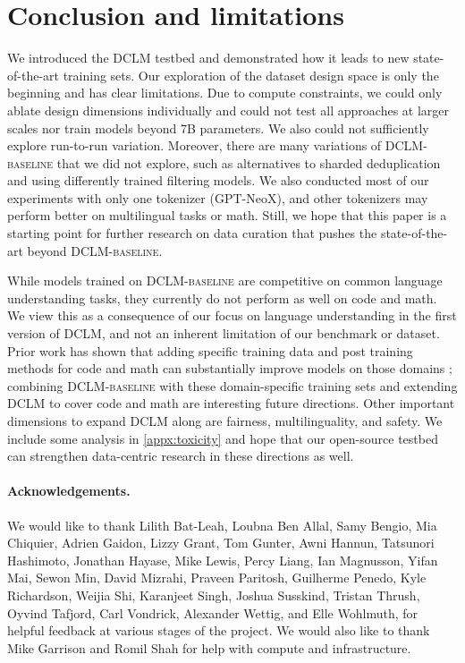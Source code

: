 \section{Conclusion and limitations }\label{sec:conclusions}

We introduced the \textsc{DCLM} testbed and demonstrated how it leads to new state-of-the-art training sets. Our exploration of the dataset design space is only the beginning and has clear limitations. Due to compute constraints, we could only ablate design dimensions individually and could not test all approaches at larger scales nor train models beyond 7B parameters. We also could not sufficiently explore run-to-run variation. Moreover, there are many variations of \textsc{DCLM-baseline} that we did not explore, such as alternatives to sharded deduplication and using differently trained filtering models. We also conducted most of our experiments with only one tokenizer (GPT-NeoX), and other tokenizers may perform better on multilingual tasks or math. Still, we hope that this paper is a starting point for further research on data curation that pushes the state-of-the-art beyond \textsc{DCLM-baseline}.

While models trained on \textsc{DCLM-baseline} are competitive on common language understanding tasks, they currently do not perform as well on code and math. We view this as a consequence of our focus on language understanding in the first version of DCLM, and not an inherent limitation of our benchmark or dataset. Prior work has shown that adding specific training data and post training methods for code and math can substantially improve models on those domains \citep{zhong2024achieving, zhang2024accessing, azerbayev2023llemma, li2023starcoder, starcoder2instruct}; combining \textsc{DCLM-baseline} with these domain-specific training sets and extending DCLM to cover code and math are interesting future directions. Other important dimensions to expand DCLM along are fairness, multilinguality, and safety. We include some analysis in \ref{appx:toxicity} and hope that our open-source testbed can strengthen data-centric research in these directions as well.

\paragraph{Acknowledgements.} We would like to thank Lilith Bat-Leah, Loubna Ben Allal, Samy Bengio, Mia Chiquier, Adrien Gaidon, Lizzy Grant, Tom Gunter, Awni Hannun, Tatsunori Hashimoto, Jonathan Hayase, Mike Lewis, Percy Liang, Ian Magnusson, Yifan Mai, Sewon Min, David Mizrahi, Praveen Paritosh, Guilherme Penedo, Kyle Richardson, Weijia Shi, Karanjeet Singh, Joshua Susskind, Tristan Thrush, Oyvind Tafjord, Carl Vondrick, Alexander Wettig, and Elle Wohlmuth, for helpful feedback at various stages of the project. We would also like to thank Mike Garrison and Romil Shah for help with compute and infrastructure.

